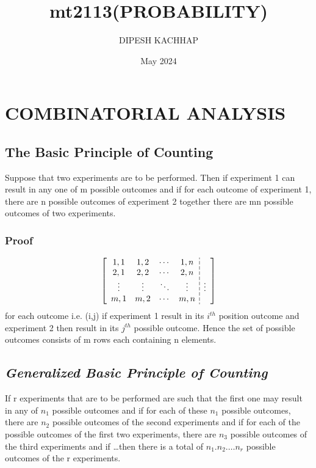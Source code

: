 \documentclass{article}
\title{mt2113(PROBABILITY)}
\author{DIPESH KACHHAP}
\date{May 2024}
\begin{document}
\maketitle
\section{\textbf{COMBINATORIAL ANALYSIS}}
\subsection*{The Basic Principle of Counting}
Suppose that two experiments are to be performed. Then if experiment 1 can result in any one of m possible outcomes and if for each outcome of experiment 1, there are n possible outcomes of experiment 2 together there are mn possible outcomes of two experiments. \\
\subsubsection*{Proof}
\begin{equation*}
\setlength{\dashlinegap}{2pt}
\left[\begin{array}{cccc:c}
{1,1} & {1,2} & \cdots & {1,n}  \\
{2,1} & {2,2} & \cdots & {2,n}  \\
\vdots & \vdots & \ddots & \vdots & \vdots \\
{m,1} & {m,2} & \cdots & {m,n} 
\end{array}
\right]
\end{equation*}
for each outcome i.e. (i,j) if experiment 1 result in its $i^{th}$ position outcome and experiment 2 then result in its $j^{th}$ possible outcome. Hence the set of possible outcomes consists of m rows each containing n elements. 
\subsection*{\textit{Generalized Basic Principle of Counting}}
If r experiments that are to be performed are such that the first one may result in any of $n_{1}$ possible outcomes and if for each of these $n_{1}$ possible outcomes, there are $n_{2}$ possible outcomes of the second experiments and if for each of the possible outcomes of the first two experiments, there are $n_{3}$ possible outcomes of the third experiments and if \ldots then there is a total of $n_{1}.n_{2}.\ldots n_{r}$ possible outcomes of the r experiments. 
\end{document}
